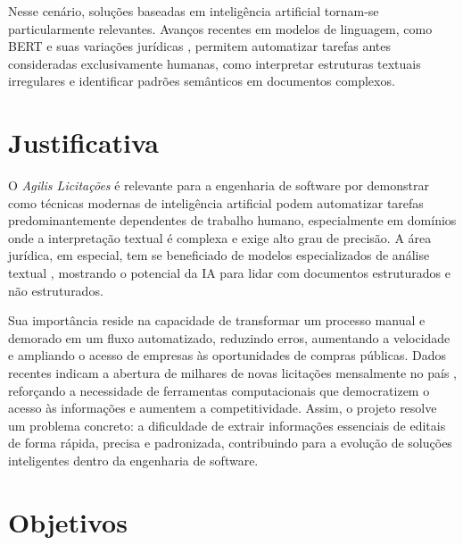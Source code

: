 Nesse cenário, soluções baseadas em inteligência artificial tornam-se particularmente relevantes. Avanços recentes em modelos de linguagem, como BERT e suas variações jurídicas \cite{devlin_bert_2019, chalkidis_legalbert_2020}, permitem automatizar tarefas antes consideradas exclusivamente humanas, como interpretar estruturas textuais irregulares e identificar padrões semânticos em documentos complexos.


\section{Justificativa}

O \textit{Agilis Licitações} é relevante para a engenharia de software por demonstrar como técnicas modernas de inteligência artificial podem automatizar tarefas predominantemente dependentes de trabalho humano, especialmente em domínios onde a interpretação textual é complexa e exige alto grau de precisão. A área jurídica, em especial, tem se beneficiado de modelos especializados de análise textual \cite{chalkidis_legalbert_2020, hendrycks_lexnlp_2020}, mostrando o potencial da IA para lidar com documentos estruturados e não estruturados.

Sua importância reside na capacidade de transformar um processo manual e demorado em um fluxo automatizado, reduzindo erros, aumentando a velocidade e ampliando o acesso de empresas às oportunidades de compras públicas. Dados recentes indicam a abertura de milhares de novas licitações mensalmente no país \cite{pncp_estatisticas_2024}, reforçando a necessidade de ferramentas computacionais que democratizem o acesso às informações e aumentem a competitividade. Assim, o projeto resolve um problema concreto: a dificuldade de extrair informações essenciais de editais de forma rápida, precisa e padronizada, contribuindo para a evolução de soluções inteligentes dentro da engenharia de software.


\section{Objetivos}

